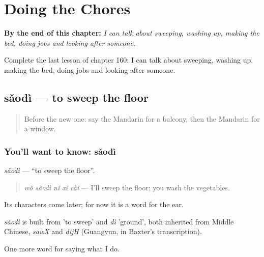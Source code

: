 
\chapter{Doing the Chores}
\label{ch:zh-doing-the-chores}

\begin{chapteropening}
\textbf{By the end of this chapter:} \emph{I can talk about sweeping, washing up, making the bed, doing jobs and looking after someone.}

Complete the last lesson of chapter 160: I can talk about sweeping, washing up, making the bed, doing jobs and looking after someone.
\end{chapteropening}

\section[sǎodì]{sǎodì — to sweep the floor}

\label{lesson:ZH-C160-saodi}



\begin{quote}
Before the new one: say the Mandarin for a balcony, then the Mandarin for a window.
\end{quote}

\subsection*{You'll want to know: sǎodì}
\emph{sǎodì} — \textquotedblleft{}to sweep the floor\textquotedblright{}.

\begin{quote}
\emph{wǒ sǎodì nǐ xǐ cài} — I'll sweep the floor; you wash the vegetables.
\end{quote}

Its characters come later; for now it is a word for the ear.

\begin{cousinweb}
\emph{sǎodì} is built from  'to sweep' and \emph{dì} 'ground', both inherited from Middle Chinese, \emph{sawX} and \emph{dijH} (Guangyun, in Baxter's transcription).
\end{cousinweb}

\begin{grammarlens}[title={What you've built}]
One more word for saying what I do.
\end{grammarlens}

